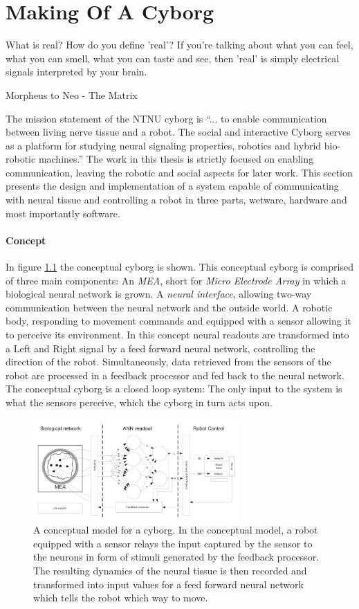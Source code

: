 \chapter{Making Of A Cyborg}
\epigraph{What is real? How do you define 'real'? If you're talking about what
you can feel, what you can smell, what you can taste and see, then 'real' is
simply electrical signals interpreted by your brain.}
{Morpheus to Neo - The Matrix}
The mission statement of the NTNU cyborg is ``... to enable communication
between living nerve tissue and a robot. The social and interactive Cyborg
serves as a platform for studying neural signaling properties, robotics and
hybrid bio-robotic machines.'' \cite{ntnu_cyborg}
The work in this thesis is strictly focused on enabling communication, leaving
the robotic and social aspects for later work.
This section presents the design and implementation of a system capable of
communicating with neural tissue and controlling a robot in three parts,
wetware, hardware and most importantly software.
\subsubsection{Concept}
In figure \ref{figOverviewSimple} the conceptual cyborg is shown.
This conceptual cyborg is comprised of three main components: An \emph{MEA}, short
for \emph{Micro Electrode Array} in which a biological neural network is grown.
A \emph{neural interface}, allowing two-way communication between the neural network and
the outside world.
A robotic body, responding to movement commands and equipped with a sensor
allowing it to perceive its environment.
In this concept neural readouts are transformed into a Left and Right signal by
a feed forward neural network, controlling the direction of the robot.
Simultaneously, data retrieved from the sensors of the robot are processed in a
feedback processor and fed back to the neural network.
The conceptual cyborg is a closed loop system: The only input to the system is
what the sensors perceive, which the cyborg in turn acts upon.
\begin{figure}[h!]
  \centering
  \includegraphics[width=0.7\textwidth]{fig/cyborg_overview.png}
  \caption{
    A conceptual model for a cyborg.
    In the conceptual model, a robot equipped with a sensor relays the input
    captured by the sensor to the neurons in form of stimuli generated by the
    feedback processor.
    The resulting dynamics of the neural tissue is then recorded and transformed
    into input values for a feed forward neural network which tells the robot
    which way to move. 
  }
  \label{figOverviewSimple}
\end{figure}
